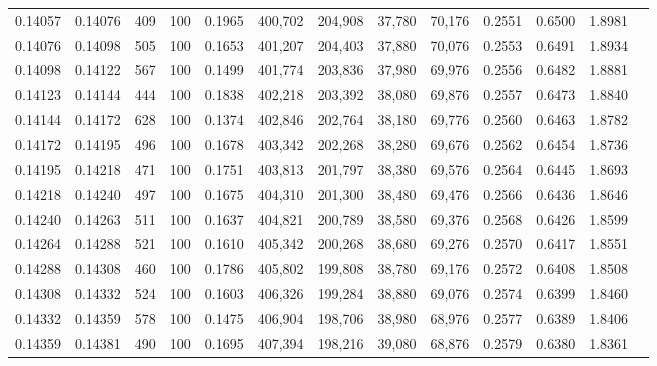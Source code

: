 \begin{tabular}{rrrrrrrrrrrrr}
0.14057 & 0.14076 &   409 & 100 &                                     0.1965 & 400,702 & 204,908 &  37,780 &  70,176 & 0.2551 & 0.6500 & 1.8981 \\
0.14076 & 0.14098 &   505 & 100 &                                     0.1653 & 401,207 & 204,403 &  37,880 &  70,076 & 0.2553 & 0.6491 & 1.8934 \\
0.14098 & 0.14122 &   567 & 100 &                                     0.1499 & 401,774 & 203,836 &  37,980 &  69,976 & 0.2556 & 0.6482 & 1.8881 \\
0.14123 & 0.14144 &   444 & 100 &                                     0.1838 & 402,218 & 203,392 &  38,080 &  69,876 & 0.2557 & 0.6473 & 1.8840 \\
0.14144 & 0.14172 &   628 & 100 &                                     0.1374 & 402,846 & 202,764 &  38,180 &  69,776 & 0.2560 & 0.6463 & 1.8782 \\
0.14172 & 0.14195 &   496 & 100 &                                     0.1678 & 403,342 & 202,268 &  38,280 &  69,676 & 0.2562 & 0.6454 & 1.8736 \\
0.14195 & 0.14218 &   471 & 100 &                                     0.1751 & 403,813 & 201,797 &  38,380 &  69,576 & 0.2564 & 0.6445 & 1.8693 \\
0.14218 & 0.14240 &   497 & 100 &                                     0.1675 & 404,310 & 201,300 &  38,480 &  69,476 & 0.2566 & 0.6436 & 1.8646 \\
0.14240 & 0.14263 &   511 & 100 &                                     0.1637 & 404,821 & 200,789 &  38,580 &  69,376 & 0.2568 & 0.6426 & 1.8599 \\
0.14264 & 0.14288 &   521 & 100 &                                     0.1610 & 405,342 & 200,268 &  38,680 &  69,276 & 0.2570 & 0.6417 & 1.8551 \\
0.14288 & 0.14308 &   460 & 100 &                                     0.1786 & 405,802 & 199,808 &  38,780 &  69,176 & 0.2572 & 0.6408 & 1.8508 \\
0.14308 & 0.14332 &   524 & 100 &                                     0.1603 & 406,326 & 199,284 &  38,880 &  69,076 & 0.2574 & 0.6399 & 1.8460 \\
0.14332 & 0.14359 &   578 & 100 &                                     0.1475 & 406,904 & 198,706 &  38,980 &  68,976 & 0.2577 & 0.6389 & 1.8406 \\
0.14359 & 0.14381 &   490 & 100 &                                     0.1695 & 407,394 & 198,216 &  39,080 &  68,876 & 0.2579 & 0.6380 & 1.8361 \\

\end{tabular}
